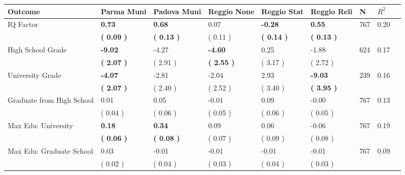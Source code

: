 \begin{tabular}{L{6.2cm} C{1.8cm} C{1.8cm} C{1.8cm} C{1.8cm} C{1.8cm} C{1.8cm} C{0.3cm} C{0.3cm}}
\toprule
 \textbf{Outcome} & \textbf{Parma Muni} & \textbf{Padova Muni} & \textbf{Reggio None} & \textbf{Reggio Stat} & \textbf{Reggio Reli} & \textbf{N} & \textbf{$ R^2$} \\
\midrule
IQ Factor & \textbf{     0.73} & \textbf{     0.68} &      0.07 & \textbf{    -0.28} & \textbf{     0.55}  & 767 &       0.20 \\ 
 & \textbf{(     0.09 )} & \textbf{(     0.13 )} & (     0.11 ) & \textbf{(     0.14 )} & \textbf{(     0.13 )}  & \\
High School Grade & \textbf{    -9.02} &     -4.27 & \textbf{    -4.60} &      0.25 &     -1.88  & 624 &       0.17 \\ 
 & \textbf{(     2.07 )} & (     2.91 ) & \textbf{(     2.55 )} & (     3.17 ) & (     2.72 )  & \\
University Grade & \textbf{    -4.07} &     -2.81 &     -2.04 &      2.93 & \textbf{    -9.03}  & 239 &       0.16 \\ 
 & \textbf{(     2.07 )} & (     2.40 ) & (     2.52 ) & (     3.40 ) & \textbf{(     3.95 )}  & \\
Graduate from High School &      0.01 &      0.05 &     -0.01 &      0.09 &     -0.00  & 767 &       0.13 \\ 
 & (     0.04 ) & (     0.06 ) & (     0.05 ) & (     0.06 ) & (     0.05 )  & \\
Max Edu: University & \textbf{     0.18} & \textbf{     0.34} &      0.09 &      0.06 &     -0.06  & 767 &       0.19 \\ 
 & \textbf{(     0.06 )} & \textbf{(     0.08 )} & (     0.07 ) & (     0.09 ) & (     0.08 )  & \\
Max Edu: Graduate School &      0.03 &     -0.01 &     -0.01 &     -0.01 &     -0.01  & 767 &       0.09 \\ 
 & (     0.02 ) & (     0.04 ) & (     0.03 ) & (     0.04 ) & (     0.03 )  & \\
\bottomrule
\end{tabular}
